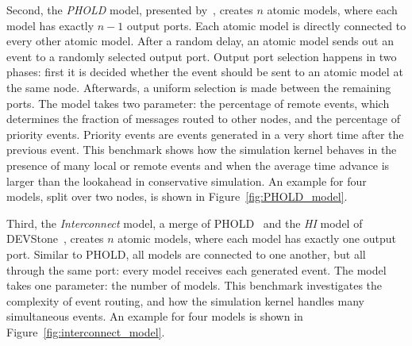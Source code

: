 Second, the \textit{PHOLD} model, presented by~\cite{PHOLD}, creates $n$ atomic models, where each model has exactly $n-1$ output ports.
Each atomic model is directly connected to every other atomic model.
After a random delay, an atomic model sends out an event to a randomly selected output port.
Output port selection happens in two phases: first it is decided whether the event should be sent to an atomic model at the same node.
Afterwards, a uniform selection is made between the remaining ports.
The model takes two parameter: the percentage of remote events, which determines the fraction of messages routed to other nodes, and the percentage of priority events. Priority events are events generated in a very short time after the previous event.
This benchmark shows how the simulation kernel behaves in the presence of many local or remote events and when the average time advance is larger than the lookahead in conservative simulation.
An example for four models, split over two nodes, is shown in Figure~\ref{fig:PHOLD_model}.
	
Third, the \textit{Interconnect} model, a merge of PHOLD~\cite{PHOLD} and the \textit{HI} model of DEVStone~\cite{DEVStone}, creates $n$ atomic models, where each model has exactly one output port.
Similar to PHOLD, all models are connected to one another, but all through the same port: every model receives each generated event.
The model takes one parameter: the number of models.
This benchmark investigates the complexity of event routing, and how the simulation kernel handles many simultaneous events.
An example for four models is shown in Figure~\ref{fig:interconnect_model}.

